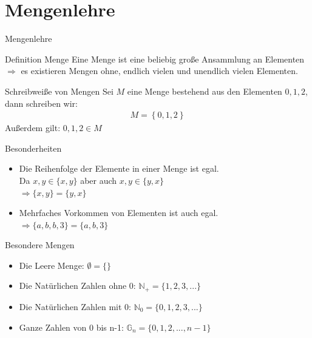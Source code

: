 \section{Mengenlehre}
	\begin{frame}{Mengenlehre}
		\begin{block} {Definition Menge}
			Eine Menge ist eine beliebig große Ansammlung an Elementen\\
			$\Rightarrow$ es existieren Mengen ohne, endlich vielen und unendlich vielen Elementen.
		\end{block}

		\begin{block}{Schreibweiße von Mengen}
			Sei $M$ eine Menge bestehend aus den Elementen $0, 1, 2$, dann schreiben wir:\\
            \begin{align*}
                M = \left\{0, 1, 2\right\}
            \end{align*}
			Außerdem gilt: $0, 1, 2 \in M$
		\end{block}
	\end{frame}

	\begin{frame}{Besonderheiten}
		\begin{itemize}
			\item Die Reihenfolge der Elemente in einer Menge ist egal.\\
				Da $x,y \in \{x,y\}$ aber auch $x,y \in \{y,x\}$\\
				$\Rightarrow \{x,y\} = \{y,x\}$
			\pause
			\item Mehrfaches Vorkommen von Elementen ist auch egal.\\
				$\Rightarrow \{a, b, b, 3\} = \{a, b, 3\}$
		\end{itemize}
	\end{frame}

	\begin{frame}{Besondere Mengen}
		\begin{itemize}
			\item Die Leere Menge: $\emptyset = \{\}$
			\pause
			\item Die Nat\"urlichen Zahlen ohne 0: $\mathbb{N}_+ = \{1,2,3,...\}$
			\pause
			\item Die Nat\"urlichen Zahlen mit 0: $\mathbb{N}_0 = \{0,1,2,3,...\}$
			\pause
			\item Ganze Zahlen von 0 bis n-1: $\mathbb{G}_n = \{0,1,2,...,n-1\}$
		\end{itemize}
	\end{frame}

